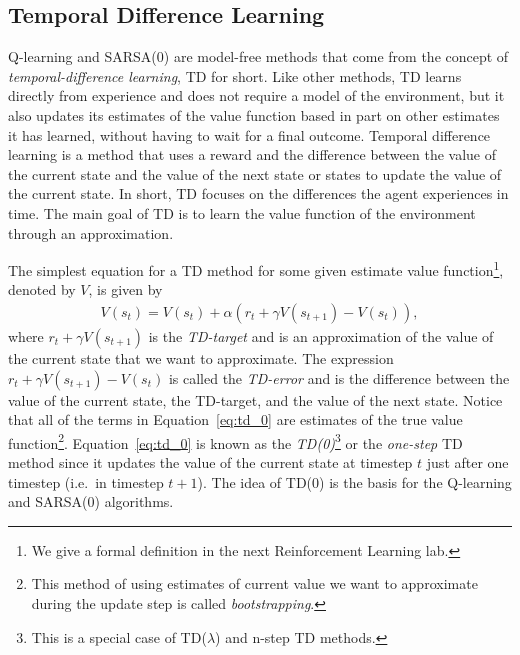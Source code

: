 \subsection*{Temporal Difference Learning}
Q-learning and SARSA(0) are model-free methods that come from the concept of \emph{temporal-difference learning}, TD for short.
Like other methods, TD learns directly from experience and does not require a model of the environment, but it also updates its estimates of the value function based in part on other estimates it has learned, without having to wait for a final outcome.
Temporal difference learning is a method that uses a reward and the difference between the value of the current state and the value of the next state or states to update the value of the current state.
In short, TD focuses on the differences the agent experiences in time.
The main goal of TD is to learn the value function of the environment through an approximation.

The simplest equation for a TD method for some given estimate value function\footnote{We give a formal definition in the next Reinforcement Learning lab.}, denoted by $V$, is given by
\begin{align}
    V(s_t)=V(s_t)+\alpha (r_t+\gamma V(s_{t+1}) - V(s_t)),
    \label{eq:td_0}
\end{align}
where $r_t+\gamma V(s_{t+1})$ is the \emph{TD-target} and is an approximation of the value of the current state that we want to approximate.
The expression $r_t+\gamma V(s_{t+1}) - V(s_t)$ is called the \emph{TD-error} and is the difference between the value of the current state, the TD-target, and the value of the next state.
Notice that all of the terms in Equation\ \ref{eq:td_0} are estimates of the true value function\footnote{This method of using estimates of current value we want to approximate during the update step is called \emph{bootstrapping}.}.
Equation\ \ref{eq:td_0} is known as the \emph{TD(0)}\footnote{This is a special case of TD($\lambda$) and n-step TD methods.} or the \emph{one-step} TD method since it updates the value of the current state at timestep $t$ just after one timestep (i.e.\ in timestep $t+1$).
The idea of TD(0) is the basis for the Q-learning and SARSA(0) algorithms.

